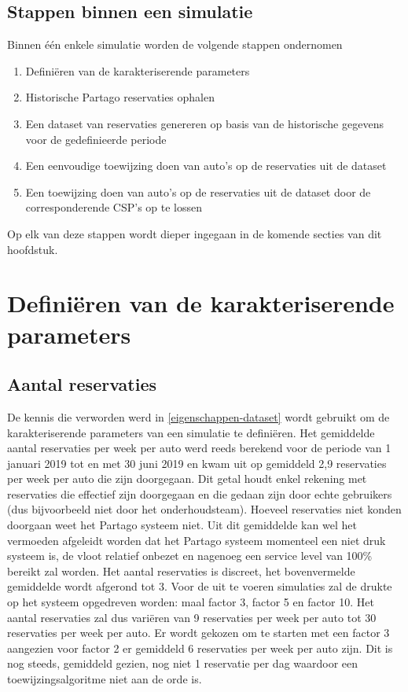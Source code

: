 \subsection{Stappen binnen een simulatie}
Binnen één enkele simulatie worden de volgende stappen ondernomen
\begin{enumerate}
	\item Definiëren van de karakteriserende parameters
	\item Historische Partago reservaties ophalen
	\item Een dataset van reservaties genereren op basis van de historische gegevens voor de gedefinieerde periode
	\item Een eenvoudige toewijzing doen van auto's op de reservaties uit de dataset
	\item Een toewijzing doen van auto's op de reservaties uit de dataset door de corresponderende CSP's op te lossen
	
\end{enumerate}
Op elk van deze stappen wordt dieper ingegaan in de komende secties van dit hoofdstuk. 

\section{Definiëren van de karakteriserende parameters} \label{karakteriserende-parameters}
\subsection{Aantal reservaties}
De kennis die verworden werd in \ref{eigenschappen-dataset} wordt gebruikt om de karakteriserende parameters van een simulatie te definiëren. Het gemiddelde aantal reservaties per week per auto werd reeds berekend voor de periode van 1 januari 2019 tot en met 30 juni 2019 en kwam uit op gemiddeld 2,9 reservaties per week per auto die zijn doorgegaan. Dit getal houdt enkel rekening met reservaties die effectief zijn doorgegaan en die gedaan zijn door echte gebruikers (dus bijvoorbeeld niet door het onderhoudsteam). Hoeveel reservaties niet konden doorgaan weet het Partago systeem niet. Uit dit gemiddelde kan wel het vermoeden afgeleidt worden dat het Partago systeem momenteel een niet druk systeem is, de vloot relatief onbezet en nagenoeg een service level van 100\% bereikt zal worden. Het aantal reservaties is discreet, het bovenvermelde gemiddelde wordt afgerond tot 3. Voor de uit te voeren simulaties zal de drukte op het systeem opgedreven worden: maal factor 3, factor 5 en factor 10. Het aantal reservaties zal dus variëren van 9 reservaties per week per auto tot 30 reservaties per week per auto. Er wordt gekozen om te starten met een factor 3 aangezien voor factor 2 er gemiddeld 6 reservaties per week per auto zijn. Dit is nog steeds, gemiddeld gezien, nog niet 1 reservatie per dag waardoor een toewijzingsalgoritme niet aan de orde is.
